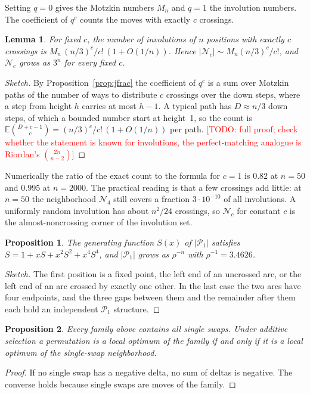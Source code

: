 \documentclass[10pt,twocolumn]{article}
\newtheorem{proposition}{Proposition}
\newtheorem{lemma}{Lemma}
\newcommand{\todo}[1]{\textcolor{red}{[TODO: #1]}}
\newcommand{\N}{\mathcal{N}}
\newcommand{\Pa}{\mathcal{P}}
\begin{document}
Setting $q=0$ gives the Motzkin numbers $M_n$ and $q=1$ the involution
numbers. The coefficient of $q^c$ counts the moves with exactly $c$
crossings.

\begin{lemma}\label{lem:poisson}
For fixed $c$, the number of involutions of $n$ positions with exactly
$c$ crossings is $M_n\,(n/3)^c/c!\,(1+O(1/n))$. Hence
$|\N_c|\sim M_n(n/3)^c/c!$, and $\N_c$ grows as $3^n$ for every fixed
$c$.
\end{lemma}
\begin{proof}[Sketch]
By Proposition~\ref{prop:jfrac} the coefficient of $q^c$ is a sum over
Motzkin paths of the number of ways to distribute $c$ crossings over the
down steps, where a step from height $h$ carries at most $h-1$. A
typical path has $D\approx n/3$ down steps, of which a bounded number
start at height~1, so the count is
$\mathbb{E}\binom{D+c-1}{c}=(n/3)^c/c!\,(1+O(1/n))$ per path.
\todo{full proof; check whether the statement is known for involutions,
the perfect-matching analogue is Riordan's $\binom{2n}{n-2}$}
\end{proof}

Numerically the ratio of the exact count to the formula for $c=1$ is
$0.82$ at $n=50$ and $0.995$ at $n=2000$. The practical reading is that
a few crossings add little: at $n=50$ the neighborhood $\N_4$ still
covers a fraction $3\cdot10^{-10}$ of all involutions. A uniformly
random involution has about $n^2/24$ crossings, so $\N_c$ for constant
$c$ is the almost-noncrossing corner of the involution set.

\begin{proposition}\label{prop:pa1}
The generating function $S(x)$ of $|\Pa_1|$ satisfies
$S=1+xS+x^2S^2+x^4S^4$, and $|\Pa_1|$ grows as $\rho^{-n}$ with
$\rho^{-1}=3.4626$.
\end{proposition}
\begin{proof}[Sketch]
The first position is a fixed point, the left end of an uncrossed arc,
or the left end of an arc crossed by exactly one other. In the last case
the two arcs have four endpoints, and the three gaps between them and
the remainder after them each hold an independent $\Pa_1$ structure.
\end{proof}

\begin{proposition}\label{prop:optima}
Every family above contains all single swaps. Under additive selection a
permutation is a local optimum of the family if and only if it is a
local optimum of the single-swap neighborhood.
\end{proposition}
\begin{proof}
If no single swap has a negative delta, no sum of deltas is negative.
The converse holds because single swaps are moves of the family.
\end{proof}
\end{document}
